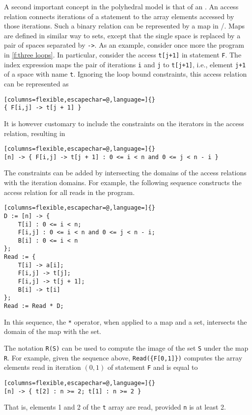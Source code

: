 A second important concept in the polyhedral model is that
of an .
An access relation connects iterations of a statement
to the array elements accessed by those iterations.
Such a binary relation can be represented by a map in \isl/.
Maps are defined in similar way to sets,
except that the single space is replaced by a pair of spaces separated
by \verb!->!.
As an example, consider once more the program in \autoref{f:three loops}.
In particular, consider the access \lstinline{t[j+1]} in
statement \lstinline{F}.
The index expression maps the pair of iterations \lstinline{i}
and \lstinline{j} to \lstinline{t[j+1]}, i.e., element \lstinline{j+1}
of a space with name \lstinline{t}.
Ignoring the loop bound constraints, this access relation can
be represented as
\begin{lstlisting}[columns=flexible,escapechar=@,language=]{}
{ F[i,j] -> t[j + 1] }
\end{lstlisting}
It is however customary to include the constraints on the iterators
in the access relation, resulting in
\begin{lstlisting}[columns=flexible,escapechar=@,language=]{}
[n] -> { F[i,j] -> t[j + 1] : 0 <= i < n and 0 <= j < n - i }
\end{lstlisting}
The constraints can be added by intersecting the domains
of the access relations with the iteration domains.
For example, the following sequence constructs the access
relation for all reads in the program.
\begin{lstlisting}[columns=flexible,escapechar=@,language=]{}
D := [n] -> {
    T[i] : 0 <= i < n;
    F[i,j] : 0 <= i < n and 0 <= j < n - i;
    B[i] : 0 <= i < n
};
Read := {
    T[i] -> a[i];
    F[i,j] -> t[j];
    F[i,j] -> t[j + 1];
    B[i] -> t[i]
};
Read := Read * D;
\end{lstlisting}
In this sequence, the \lstinline{*} operator, when applied
to a map and a set, intersects the domain of the map with the set.

The notation \lstinline{R(S)} can be used to compute the image
of the set \lstinline{S} under the map \lstinline{R}.
For example, given the sequence above, \lstinline!Read({F[0,1]})!
computes the array elements read in iteration $(0,1)$ of statement
\lstinline{F} and is equal to
\begin{lstlisting}[columns=flexible,escapechar=@,language=]{}
[n] -> { t[2] : n >= 2; t[1] : n >= 2 }
\end{lstlisting}
That is, elements 1 and 2 of the \lstinline{t} array are read,
provided \lstinline{n} is at least 2.

